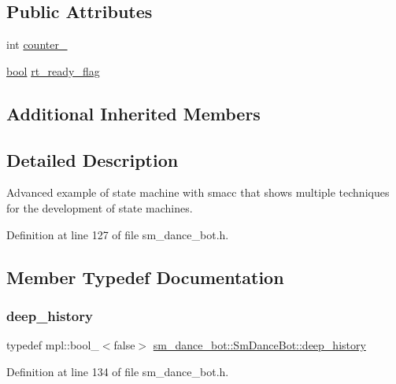 \subsection*{Public Attributes}
\begin{DoxyCompactItemize}
\item 
int \hyperlink{structsm__dance__bot_1_1SmDanceBot_ab3b8db557ce94d34c60b291911eb140c}{counter\+\_}
\item 
\hyperlink{classbool}{bool} \hyperlink{structsm__dance__bot_1_1SmDanceBot_a0f0587a13670ad8925555cd8f6cb6b2d}{rt\+\_\+ready\+\_\+flag}
\end{DoxyCompactItemize}
\subsection*{Additional Inherited Members}


\subsection{Detailed Description}
Advanced example of state machine with smacc that shows multiple techniques for the development of state machines. 

Definition at line 127 of file sm\+\_\+dance\+\_\+bot.\+h.



\subsection{Member Typedef Documentation}
\mbox{\label{structsm__dance__bot_1_1SmDanceBot_abd58ec4a2b50a45da304a5f0b9c44706}} 
\subsubsection{\texorpdfstring{deep\+\_\+history}{deep\_history}}
{\footnotesize\ttfamily typedef mpl\+::bool\+\_\+$<$false$>$ \hyperlink{structsm__dance__bot_1_1SmDanceBot_abd58ec4a2b50a45da304a5f0b9c44706}{sm\+\_\+dance\+\_\+bot\+::\+Sm\+Dance\+Bot\+::deep\+\_\+history}}



Definition at line 134 of file sm\+\_\+dance\+\_\+bot.\+h.

